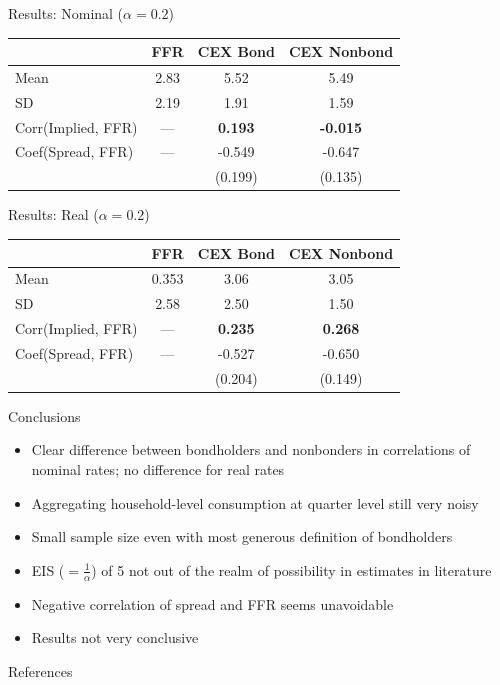 \documentclass{beamer}
\begin{document}
\begin{frame}{Results: Nominal ($\alpha = 0.2$)}
\begin{center}
\begin{tabular}{lccc}
                   & FFR  & CEX Bond       & CEX Nonbond \\ \hline
Mean               & 2.83 & 5.52           & 5.49 \\
SD                 & 2.19 & 1.91           & 1.59 \\
Corr(Implied, FFR) & ---  & \textbf{0.193} & \textbf{-0.015} \\
Coef(Spread, FFR)  & ---  & -0.549         & -0.647 \\
                   &      & (0.199)        & (0.135)
\end{tabular}
\end{center}
\end{frame}

\begin{frame}{Results: Real ($\alpha = 0.2$)}
\begin{center}
\begin{tabular}{lccc}
                   & FFR   & CEX Bond       & CEX Nonbond \\ \hline
Mean               & 0.353 & 3.06           & 3.05 \\
SD                 & 2.58  & 2.50           & 1.50 \\
Corr(Implied, FFR) & ---   & \textbf{0.235} & \textbf{0.268} \\
Coef(Spread, FFR)  & ---   & -0.527         & -0.650 \\
                   &       & (0.204)        & (0.149) \\
\end{tabular}
\end{center}
\end{frame}

\begin{frame}{Conclusions}
\begin{itemize}
\item Clear difference between bondholders and nonbonders in correlations of nominal rates; no difference for real rates
\item Aggregating household-level consumption at quarter level still very noisy
\item Small sample size even with most generous definition of bondholders
\item EIS ($= \frac{1}{\alpha}$) of 5 not out of the realm of possibility in estimates in literature
\item Negative correlation of spread and FFR seems unavoidable
\item Results not very conclusive
\end{itemize}
\end{frame}

\begin{frame}{References}


\end{frame}
\end{document}
